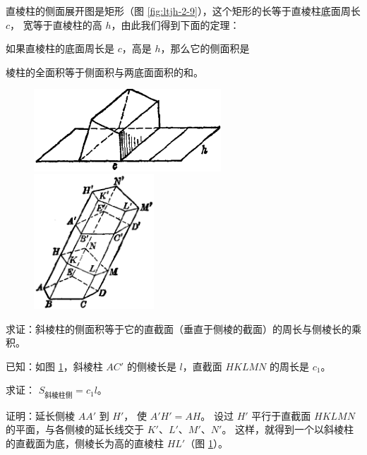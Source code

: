 直棱柱的侧面展开图是矩形（图 \ref{fig:ltjh-2-9}），这个矩形的长等于直棱柱底面周长 $c$，
宽等于直棱柱的高 $h$，由此我们得到下面的定理：

\begin{dingli}[定理]
    如果直棱柱的底面周长是 $c$，高是 $h$，那么它的侧面积是

    \begin{center}
    \end{center}
\end{dingli}

棱柱的全面积等于侧面积与两底面面积的和。

\begin{figure}[htbp]
    \centering
    \begin{minipage}[b]{7cm}
        \centering
        \includegraphics[width=7cm]{../pic/ltjh-ch2-09.png}
        \caption{}\label{fig:ltjh-2-9}
    \end{minipage}
    \qquad
    \begin{minipage}[b]{7cm}
        \centering
        \includegraphics[width=4.5cm]{../pic/ltjh-ch2-10.png}
        \caption{}\label{fig:ltjh-2-10}
    \end{minipage}
\end{figure}

\liti 求证：斜棱柱的侧面积等于它的直截面（垂直于侧棱的截面）的周长与侧棱长的乘积。

已知：如图 \ref{fig:ltjh-2-10}，斜棱柱 $AC'$ 的侧棱长是 $l$，直截面 $HKLMN$ 的周长是 $c_1$。

求证： $S_\text{斜棱柱侧} = c_1l$。

证明：延长侧棱 $AA'$ 到 $H'$， 使 $A'H' = AH$。
设过 $H'$ 平行于直截面 $HKLMN$ 的平面，与各侧棱的延长线交于 $K'$、$L'$、$M'$、$N'$。
这样，就得到一个以斜棱柱的直截面为底，侧棱长为高的直棱柱 $HL'$（图 \ref{fig:ltjh-2-10}）。

